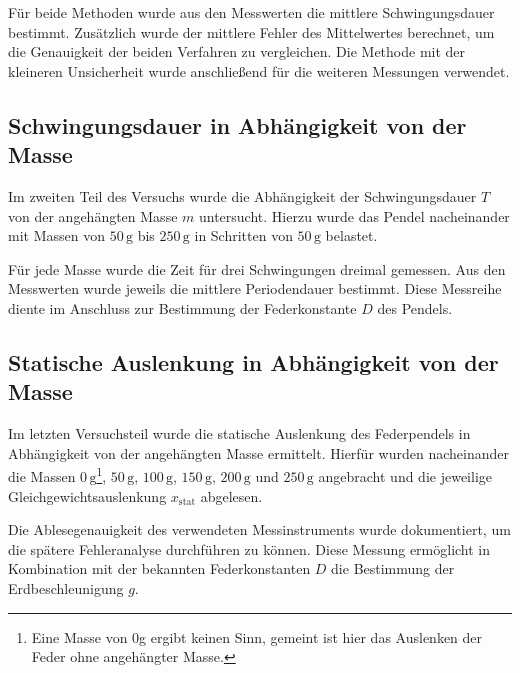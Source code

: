 Für beide Methoden wurde aus den Messwerten die mittlere Schwingungsdauer bestimmt. Zusätzlich wurde der mittlere Fehler des Mittelwertes berechnet, um die Genauigkeit der beiden Verfahren zu vergleichen. Die Methode mit der kleineren Unsicherheit wurde anschließend für die weiteren Messungen verwendet.  

\subsection{Schwingungsdauer in Abhängigkeit von der Masse}
Im zweiten Teil des Versuchs wurde die Abhängigkeit der Schwingungsdauer $T$ von der angehängten Masse $m$ untersucht. Hierzu wurde das Pendel nacheinander mit Massen von $50\,\mathrm{g}$ bis $250\,\mathrm{g}$ in Schritten von $50\,\mathrm{g}$ belastet.  

Für jede Masse wurde die Zeit für drei Schwingungen dreimal gemessen. Aus den Messwerten wurde jeweils die mittlere Periodendauer bestimmt. Diese Messreihe diente im Anschluss zur Bestimmung der Federkonstante $D$ des Pendels.  

\subsection{Statische Auslenkung in Abhängigkeit von der Masse}
Im letzten Versuchsteil wurde die statische Auslenkung des Federpendels in Abhängigkeit von der angehängten Masse ermittelt. Hierfür wurden nacheinander die Massen $0\,\mathrm{g}$\footnote{Eine Masse von 0g ergibt keinen Sinn, gemeint ist hier das Auslenken der Feder ohne angehängter Masse.}, $50\,\mathrm{g}$, $100\,\mathrm{g}$, $150\,\mathrm{g}$, $200\,\mathrm{g}$ und $250\,\mathrm{g}$ angebracht und die jeweilige Gleichgewichtsauslenkung $x_\text{stat}$ abgelesen.  

Die Ablesegenauigkeit des verwendeten Messinstruments wurde dokumentiert, um die spätere Fehleranalyse durchführen zu können. Diese Messung ermöglicht in Kombination mit der bekannten Federkonstanten $D$ die Bestimmung der Erdbeschleunigung $g$.  
